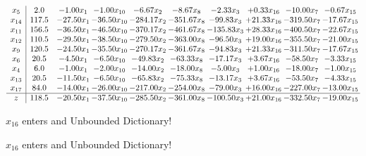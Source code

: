 \documentclass[9pt]{article}
\begin{document}
 \[\begin{array}{c| c c@{\hskip 2pt} c@{\hskip 2pt} c@{\hskip 2pt} c@{\hskip 2pt} c@{\hskip 2pt} c@{\hskip 2pt} c@{\hskip 2pt} c@{\hskip 2pt} }
 x_{5}   &  2.0 & -1.00 x_{1} & -1.00 x_{10} & -6.67 x_{2} & -8.67 x_{8} & -2.33 x_{3} & +  0.33 x_{16} & -10.00 x_{7} & -0.67 x_{15}\\
 x_{14}   &  117.5 & -27.50 x_{1} & -36.50 x_{10} & -284.17 x_{2} & -351.67 x_{8} & -99.83 x_{3} & + 21.33 x_{16} & -319.50 x_{7} & -17.67 x_{15}\\
 x_{11}   &  156.5 & -36.50 x_{1} & -46.50 x_{10} & -370.17 x_{2} & -461.67 x_{8} & -135.83 x_{3} & + 28.33 x_{16} & -400.50 x_{7} & -22.67 x_{15}\\
 x_{12}   &  110.5 & -29.50 x_{1} & -38.50 x_{10} & -279.50 x_{2} & -363.00 x_{8} & -96.50 x_{3} & + 19.00 x_{16} & -355.50 x_{7} & -21.00 x_{15}\\
 x_{9}   &  120.5 & -24.50 x_{1} & -35.50 x_{10} & -270.17 x_{2} & -361.67 x_{8} & -94.83 x_{3} & + 21.33 x_{16} & -311.50 x_{7} & -17.67 x_{15}\\
 x_{6}   &  20.5 & -4.50 x_{1} & -6.50 x_{10} & -49.83 x_{2} & -63.33 x_{8} & -17.17 x_{3} & +  3.67 x_{16} & -58.50 x_{7} & -3.33 x_{15}\\
 x_{4}   &  6.0 & -1.00 x_{1} & -2.00 x_{10} & -14.00 x_{2} & -18.00 x_{8} & -5.00 x_{3} & +  1.00 x_{16} & -18.00 x_{7} & -1.00 x_{15}\\
 x_{13}   &  20.5 & -11.50 x_{1} & -6.50 x_{10} & -65.83 x_{2} & -75.33 x_{8} & -13.17 x_{3} & +  3.67 x_{16} & -53.50 x_{7} & -4.33 x_{15}\\
 x_{17}   &  84.0 & -14.00 x_{1} & -26.00 x_{10} & -217.00 x_{2} & -254.00 x_{8} & -79.00 x_{3} & + 16.00 x_{16} & -227.00 x_{7} & -13.00 x_{15}\\
\hline
z    &  118.5 & -20.50 x_{1} & -37.50 x_{10} & -285.50 x_{2} & -361.00 x_{8} & -100.50 x_{3} & + 21.00 x_{16} & -332.50 x_{7} & -19.00 x_{15}\\
\end{array}\]


 $ x_{16} $ enters and Unbounded Dictionary!


 $ x_{16} $ enters and Unbounded Dictionary!
\end{document}

